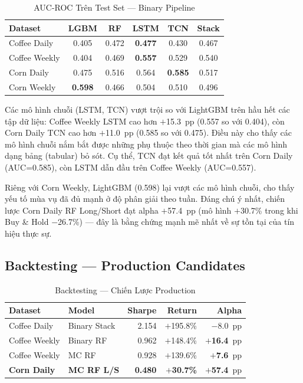 \documentclass[conference]{IEEEtran}
\begin{document}
\begin{table}[t]
\caption{AUC-ROC Trên Test Set --- Binary Pipeline}
\label{tab:auc}
\centering
\begin{tabular}{@{}lccccc@{}}
\toprule
\textbf{Dataset} & \textbf{LGBM} & \textbf{RF} & \textbf{LSTM} & \textbf{TCN} & \textbf{Stack} \\
\midrule
Coffee Daily  & 0.405 & 0.472 & \textbf{0.477} & 0.430 & 0.467 \\
Coffee Weekly & 0.404 & 0.469 & \textbf{0.557} & 0.529 & 0.540 \\
Corn Daily    & 0.475 & 0.516 & 0.564 & \textbf{0.585} & 0.517 \\
Corn Weekly   & \textbf{0.598} & 0.466 & 0.504 & 0.510 & 0.496 \\
\bottomrule
\end{tabular}
\end{table}

Các mô hình chuỗi (LSTM, TCN) vượt trội so với LightGBM trên hầu hết các tập
dữ liệu: Coffee Weekly LSTM cao hơn $+$15.3~pp (0.557 so với 0.404), còn Corn
Daily TCN cao hơn $+$11.0~pp (0.585 so với 0.475). Điều này cho thấy các mô
hình chuỗi nắm bắt được những phụ thuộc theo thời gian mà các mô hình dạng
bảng (tabular) bỏ sót. Cụ thể, TCN đạt kết quả tốt nhất trên Corn Daily
(AUC=0.585), còn LSTM dẫn đầu trên Coffee Weekly (AUC=0.557).

Riêng với Corn Weekly, LightGBM (0.598) lại vượt các mô hình chuỗi, cho thấy
yếu tố mùa vụ đã đủ mạnh ở độ phân giải theo tuần. Đáng chú ý nhất, chiến
lược Corn Daily RF Long/Short đạt alpha $+$57.4~pp (mô hình $+$30.7\% trong
khi Buy \& Hold $-$26.7\%) --- đây là bằng chứng mạnh mẽ nhất về sự tồn tại
của tín hiệu thực sự.

\subsection{Backtesting --- Production Candidates}

\begin{table}[t]
\caption{Backtesting --- Chiến Lược Production}
\label{tab:backtest}
\centering
\begin{tabular}{@{}llrrr@{}}
\toprule
\textbf{Dataset} & \textbf{Model} & \textbf{Sharpe} & \textbf{Return} & \textbf{Alpha} \\
\midrule
Coffee Daily  & Binary Stack   & 2.154 & $+$195.8\% & $-$8.0~pp \\
Coffee Weekly & Binary RF      & 0.962 & $+$148.4\% & $+$\textbf{16.4}~pp \\
Coffee Weekly & MC RF          & 0.928 & $+$139.6\% & $+$\textbf{7.6}~pp \\
\textbf{Corn Daily}  & \textbf{MC RF L/S} & \textbf{0.480} & $+$\textbf{30.7\%} & $+$\textbf{57.4}~pp \\
\bottomrule
\end{tabular}
\end{table}
\end{document}
